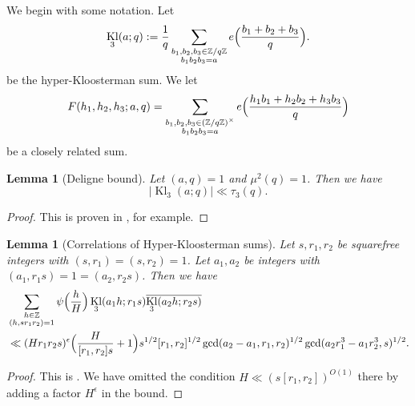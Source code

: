 \documentclass[10pt]{amsart}
\theoremstyle{plain}
\newtheorem{lmm}[thrm]{Lemma}
\numberwithin{equation}{section}
\DeclareMathOperator{\Kl}{Kl}
\begin{document}
We begin with some notation. Let
\[
\Kl_3(a;q):=\frac{1}{q}\sum_{\substack{b_1,b_2,b_3\in \mathbb{Z}/q\mathbb{Z}\\ b_1b_2b_3=a}}e\Bigl(\frac{b_1+b_2+b_3}{q}\Bigr).
\]
be the hyper-Kloosterman sum. We let
\begin{equation}
F(h_1,h_2,h_3;a,q)=\sum_{\substack{b_1,b_2,b_3\in(\mathbb{Z}/q\mathbb{Z})^\times \\ b_1b_2b_3=a}}e\Bigl(\frac{h_1b_1+h_2b_2+h_3b_3}{q}\Bigr)
\label{eq:FDef}
\end{equation}
be a closely related sum.
%
%
%
%
%
%
%
%
\begin{lmm}[Deligne bound]\label{lmm:Deligne}
Let $(a,q)=1$ and $\mu^2(q)=1$. Then we have
\[
|\Kl_3(a;q)|\ll \tau_3(q).
\]
\end{lmm}
%
%
%
%
\begin{proof}
This is proven in \cite[\S 7]{DeligneApp}, for example.
\end{proof}
%
%
%
%
%
%
%
%
\begin{lmm}[Correlations of Hyper-Kloosterman sums]\label{lmm:KloostermanCorrelation}
Let $s,r_1,r_2$ be squarefree integers with $(s,r_1)=(s,r_2)=1$. Let $a_1,a_2$ be integers with $(a_1,r_1s)=1=(a_2,r_2s)$. Then we have
\begin{align*}
&\sum_{\substack{h\in\mathbb{Z}\\ (h,s r_1 r_2)=1}}\psi\Bigl(\frac{h}{H}\Bigr)\Kl_3(a_1h;r_1s)\overline{\Kl_3(a_2h;r_2s)}\\
&\ll (Hr_1r_2s)^\epsilon\Bigl(\frac{H}{[r_1,r_2]s}+1\Bigr)s^{1/2}[r_1,r_2]^{1/2}\gcd(a_2-a_1,r_1,r_2)^{1/2}\gcd(a_2r_1^3-a_1r_2^3,s)^{1/2}.
\end{align*}
\end{lmm}
%
%
%
%
\begin{proof}
This is \cite[Corollary 6.26]{Polymath}. We have omitted the condition $H\ll (s[r_1,r_2])^{O(1)}$ there by adding a factor $H^\epsilon$ in the bound.
\end{proof}
%
%
%
%
%
%
%
%
\end{document}
